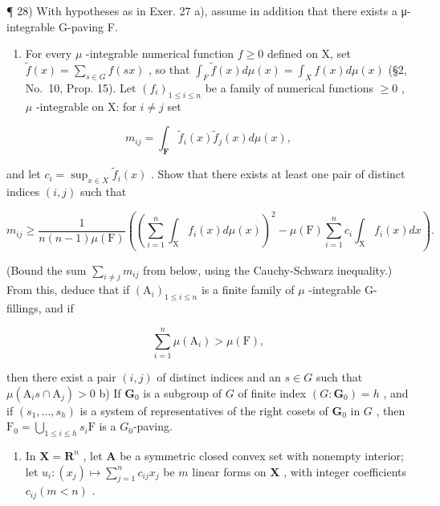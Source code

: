 ¶ 28) With hypotheses as in Exer. 27 a), assume in addition that there exists a μ-integrable G-paving F.

\begin{enumerate}
\def\labelenumi{\alph{enumi})}
\tightlist
\item
  For every \(\mu\) -integrable numerical function \(f \geqslant 0\) defined on X, set \(\widetilde{f}(x) = \sum_{s \in G} f(sx)\) , so that \(\int_{F} \widetilde{f}(x) d\mu(x) = \int_{X} f(x) d\mu(x)\) (§2, No.~10, Prop. 15). Let \((f_i)_{1 \leqslant i \leqslant n}\) be a family of numerical functions \(\geqslant 0\) , \(\mu\) -integrable on X: for \(i \neq j\) set
\end{enumerate}

\[
m _ {i j} = \int_ {\mathbf {F}} \widetilde {f} _ {i} (x) \widetilde {f} _ {j} (x) d \mu (x),
\]

and let \(c_{i} = \sup_{x\in X}\widetilde{f}_{i}(x)\) . Show that there exists at least one pair of distinct indices \((i,j)\) such that

\[
m _ {i j} \geqslant \frac {1}{n (n - 1) \mu (\mathrm{F})} \left(\left(\sum_ {i = 1} ^ {n} \int_ {\mathrm{X}} f _ {i} (x) d \mu (x)\right) ^ {2} - \mu (\mathrm{F}) \sum_ {i = 1} ^ {n} c _ {i} \int_ {\mathrm{X}} f _ {i} (x) d x\right).
\]

(Bound the sum \(\sum_{i\neq j}m_{ij}\) from below, using the Cauchy-Schwarz inequality.) From this, deduce that if \((\mathrm{A}_i)_{1\leqslant i\leqslant n}\) is a finite family of \(\mu\) -integrable G-fillings, and if

\[
\sum_ {i = 1} ^ {n} \mu (\mathrm{A} _ {i}) > \mu (\mathrm{F}),
\]

then there exist a pair \((i,j)\) of distinct indices and an \(s\in G\) such that \(\mu (\mathrm{A}_is\cap \mathrm{A}_j) > 0\) b) If \(\mathbf{G}_0\) is a subgroup of \(G\) of finite index \((G:\mathbf{G}_0) = h\) , and if \((s_1,\ldots ,s_h)\) is a system of representatives of the right cosets of \(\mathbf{G}_0\) in \(G\) , then \(\mathrm{F_0} = \bigcup_{1\leqslant i\leqslant h}s_i\mathrm{F}\) is a \(G_{0}\)-paving.

\begin{enumerate}
\def\labelenumi{\alph{enumi})}
\setcounter{enumi}{2}
\tightlist
\item
  In \(\mathbf{X} = \mathbf{R}^n\) , let \(\mathbf{A}\) be a symmetric closed convex set with nonempty interior; let \(u_i : (x_j) \mapsto \sum_{j=1}^{n} c_{ij} x_j\) be \(m\) linear forms on \(\mathbf{X}\) , with integer coefficients \(c_{ij} (m < n)\) .
\end{enumerate}

